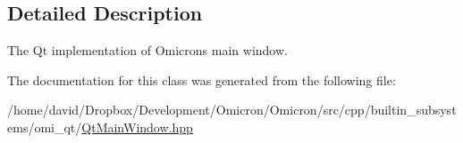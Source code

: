 \subsection{Detailed Description}
The Qt implementation of Omicron\textquotesingle{}s main window. 

The documentation for this class was generated from the following file\+:\begin{DoxyCompactItemize}
\item 
/home/david/\+Dropbox/\+Development/\+Omicron/\+Omicron/src/cpp/builtin\+\_\+subsystems/omi\+\_\+qt/\hyperlink{_qt_main_window_8hpp}{Qt\+Main\+Window.\+hpp}\end{DoxyCompactItemize}
